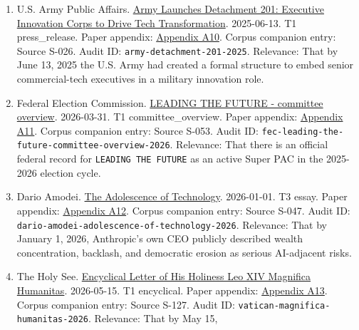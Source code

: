 \documentclass[
  american,
  11pt,
  letterpaper,
]{article}
\begin{document}
\begin{enumerate}
{  A9}. Corpus companion entry: Source S-098. Audit ID:
  \texttt{palantir-anthropic-aws-gov-partnership-2024}. Relevance: That
  by November 7, 2024 Anthropic model access for U.S. intelligence and
  defense agencies was being publicly distributed through a
  Palantir-plus-AWS stack.
\item
  U.S. Army Public Affairs.
  \href{https://www.army.mil/article/286317/army_launches_detachment_201_executive_innovation_corps_to_drive_tech_transformation}{Army
  Launches Detachment 201: Executive Innovation Corps to Drive Tech
  Transformation}. 2025-06-13. T1 press\_release. Paper appendix:
  \hyperref[ch-08-appendix-a10-army-launches-detachment-201-executive-innovation-corps-to-drive-tech-transformation]{Appendix
  A10}. Corpus companion entry: Source S-026. Audit ID:
  \texttt{army-detachment-201-2025}. Relevance: That by June 13, 2025
  the U.S. Army had created a formal structure to embed senior
  commercial-tech executives in a military innovation role.
\item
  Federal Election Commission.
  \href{https://www.fec.gov/data/committee/C00916114/}{LEADING THE
  FUTURE - committee overview}. 2026-03-31. T1 committee\_overview.
  Paper appendix:
  \hyperref[ch-08-appendix-a11-leading-the-future-committee-overview]{Appendix
  A11}. Corpus companion entry: Source S-053. Audit ID:
  \texttt{fec-leading-the-future-committee-overview-2026}. Relevance:
  That there is an official federal record for
  \texttt{LEADING\ THE\ FUTURE} as an active Super PAC in the 2025-2026
  election cycle.
\item
  Dario Amodei.
  \href{https://darioamodei.com/essay/the-adolescence-of-technology}{The
  Adolescence of Technology}. 2026-01-01. T3 essay. Paper appendix:
  \hyperref[ch-08-appendix-a12-the-adolescence-of-technology]{Appendix
  A12}. Corpus companion entry: Source S-047. Audit ID:
  \texttt{dario-amodei-adolescence-of-technology-2026}. Relevance: That
  by January 1, 2026, Anthropic's own CEO publicly described wealth
  concentration, backlash, and democratic erosion as serious AI-adjacent
  risks.
\item
  The Holy See.
  \href{https://www.vatican.va/content/leo-xiv/en/encyclicals/documents/20260515-magnifica-humanitas.html}{Encyclical
  Letter of His Holiness Leo XIV Magnifica Humanitas}. 2026-05-15. T1
  encyclical. Paper appendix:
  \hyperref[ch-08-appendix-a13-encyclical-letter-of-his-holiness-leo-xiv-magnifica-humanitas]{Appendix
  A13}. Corpus companion entry: Source S-127. Audit ID:
  \texttt{vatican-magnifica-humanitas-2026}. Relevance: That by May 15,

\end{enumerate}
\end{document}
